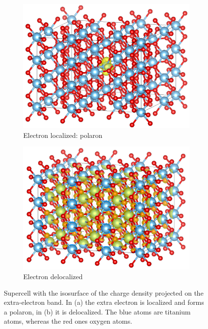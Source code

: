 \begin{figure}[p]
    \centering
    \begin{subfigure}[b]{0.49\textwidth}
        \centering
        \includegraphics[width=\textwidth]{figures/PARCHG_polaron_super}
        \caption{Electron localized: polaron}
        \label{fig:polaron_iso_super}
    \end{subfigure}
    \hfill
    \begin{subfigure}[b]{0.49\textwidth}
        \centering
        \includegraphics[width=\textwidth]{figures/PARCHG_delocalized_super}
        \caption{Electron delocalized}
        \label{fig:delocalized_iso_super}
    \end{subfigure}
    \caption[Supercell with the isosurface of the charge density projected on the extra-electron band]{Supercell with the isosurface of the charge density projected on the extra-electron band. In (a) the extra electron is localized and forms a polaron, in (b) it is delocalized. The blue atoms are titanium atoms, whereas the red ones oxygen atoms.
    }
    \label{fig:isosurfaces_supercell}
\end{figure}
